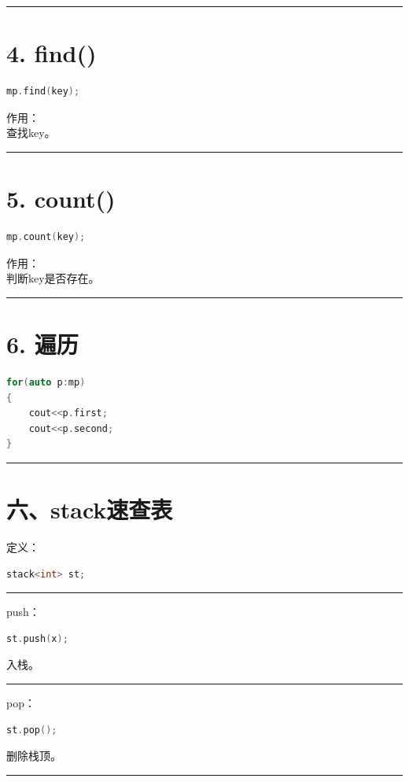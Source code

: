 \documentclass[10pt,twocolumn]{extarticle}
\begin{document}
\noindent\rule{\linewidth}{0.4pt}

\section{4. find()}
\begin{lstlisting}[language=C++]
mp.find(key);
\end{lstlisting}
作用：\\
查找key。

\noindent\rule{\linewidth}{0.4pt}

\section{5. count()}
\begin{lstlisting}[language=C++]
mp.count(key);
\end{lstlisting}
作用：\\
判断key是否存在。

\noindent\rule{\linewidth}{0.4pt}

\section{6. 遍历}
\begin{lstlisting}[language=C++]
for(auto p:mp)
{
    cout<<p.first;
    cout<<p.second;
}
\end{lstlisting}

\noindent\rule{\linewidth}{0.4pt}

\section{六、stack速查表}

定义：
\begin{lstlisting}[language=C++]
stack<int> st;
\end{lstlisting}

\noindent\rule{\linewidth}{0.4pt}

push：
\begin{lstlisting}[language=C++]
st.push(x);
\end{lstlisting}
入栈。

\noindent\rule{\linewidth}{0.4pt}

pop：
\begin{lstlisting}[language=C++]
st.pop();
\end{lstlisting}
删除栈顶。

\noindent\rule{\linewidth}{0.4pt}
\end{document}
